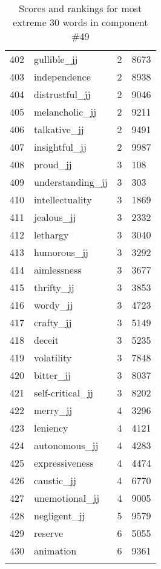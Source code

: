 \begin{longtable}[!htbp]{| rlr@{.}l |}
    402 & gullible\_jj & 2 & 8673 \\
    403 & independence & 2 & 8938 \\
    404 & distrustful\_jj & 2 & 9046 \\
    405 & melancholic\_jj & 2 & 9211 \\
    406 & talkative\_jj & 2 & 9491 \\
    407 & insightful\_jj & 2 & 9987 \\
    408 & proud\_jj & 3 & 108 \\
    409 & understanding\_jj & 3 & 303 \\
    410 & intellectuality & 3 & 1869 \\
    411 & jealous\_jj & 3 & 2332 \\
    412 & lethargy & 3 & 3040 \\
    413 & humorous\_jj & 3 & 3292 \\
    414 & aimlessness & 3 & 3677 \\
    415 & thrifty\_jj & 3 & 3853 \\
    416 & wordy\_jj & 3 & 4723 \\
    417 & crafty\_jj & 3 & 5149 \\
    418 & deceit & 3 & 5235 \\
    419 & volatility & 3 & 7848 \\
    420 & bitter\_jj & 3 & 8037 \\
    421 & self-critical\_jj & 3 & 8202 \\
    422 & merry\_jj & 4 & 3296 \\
    423 & leniency & 4 & 4121 \\
    424 & autonomous\_jj & 4 & 4283 \\
    425 & expressiveness & 4 & 4474 \\
    426 & caustic\_jj & 4 & 6770 \\
    427 & unemotional\_jj & 4 & 9005 \\
    428 & negligent\_jj & 5 & 9579 \\
    429 & reserve & 6 & 5055 \\
    430 & animation & 6 & 9361 \\
    \hline
    \caption{Scores and rankings for most extreme 30 words in component \#49} \\
\end{longtable}
